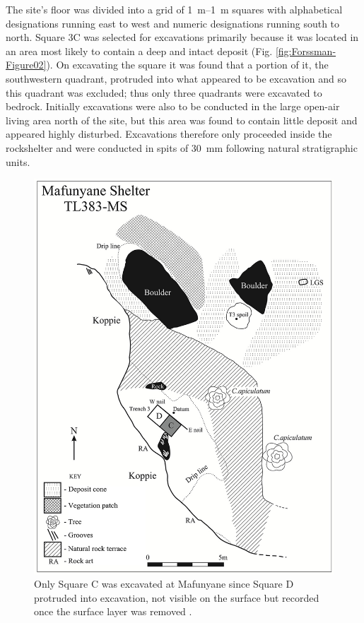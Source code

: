 The site’s floor was  divided into a grid of \SIrange{1}{1}{\meter} squares with alphabetical designations running east to west and numeric designations running south to north. 
Square 3C was selected for excavations primarily because it was located in an area most likely to contain a deep and intact deposit (Fig. \ref{fig:Forssman-Figure02}). 
On excavating the square it was found that a portion of it, the southwestern quadrant, protruded into what appeared to be \textcite['s]{Walker_1994} excavation and so this quadrant was excluded; thus only three quadrants were excavated to bedrock. Initially excavations were also to be conducted in the large open-air living area north of the site, but this area was found to contain little deposit and appeared highly disturbed. 
Excavations therefore only proceeded inside the rockshelter and were conducted in spits of \SI{30}{\milli\meter} following natural stratigraphic units.

	\begin{figure}
		\includegraphics[width=\linewidth]{figures/Forssman-Figure02}
		\caption{Only Square C was excavated at Mafunyane since Square D protruded into \textcite['s]{Walker_1994} excavation, not visible on the surface but recorded once the surface layer was removed \parencite[from][96]{Forssman_2014a}.}
		\label{fig:Forssmann-Figure02}
	\end{figure}

